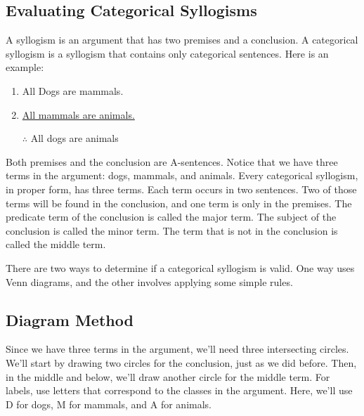 \documentclass[../logic-text.tex]{subfiles}
\begin{document}
\subsection{Evaluating Categorical Syllogisms}

A syllogism is an argument that has two premises and a conclusion. A categorical syllogism is a syllogism that contains only categorical sentences. Here is an example:

\begin{enumerate}
\item All Dogs are mammals.
\item \underline{All mammals are animals.}
\item [$\therefore$]All dogs are animals
\end{enumerate}

Both premises and the conclusion are A-sentences. Notice that we have three terms in the argument: dogs, mammals, and animals. Every categorical syllogism, in proper form, has three terms. Each term occurs in two sentences. Two of those terms will be found in the conclusion, and one term is only in the premises. The predicate term of the conclusion is called the major term. The subject of the conclusion is called the minor term. The term that is not in the conclusion is called the middle term.

There are two ways to determine if a categorical syllogism is valid. One way uses Venn diagrams, and the other involves applying some simple rules.

\subsection{Diagram Method}

Since we have three terms in the argument, we'll need three intersecting circles. We'll start by drawing two circles for the conclusion, just as we did before. Then, in the middle and below, we'll draw another circle for the middle term. For labels, use letters that correspond to the classes in the argument. Here, we'll use D for dogs, M for mammals, and A for animals.
\end{document}
